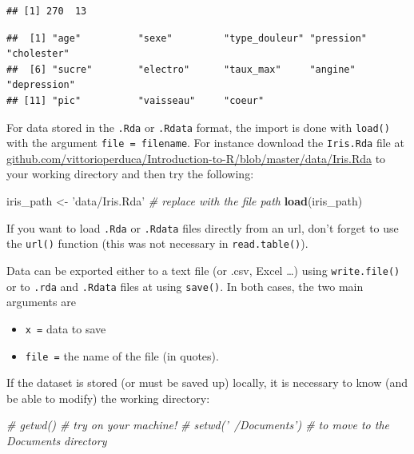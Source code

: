 \documentclass[]{book}
\newenvironment{Shaded}{\begin{snugshade}}{\end{snugshade}}
\newcommand{\CommentTok}[1]{\textcolor[rgb]{0.56,0.35,0.01}{\textit{#1}}}
\newcommand{\KeywordTok}[1]{\textcolor[rgb]{0.13,0.29,0.53}{\textbf{#1}}}
\newcommand{\NormalTok}[1]{#1}
\newcommand{\StringTok}[1]{\textcolor[rgb]{0.31,0.60,0.02}{#1}}
\providecommand{\tightlist}{%
  \setlength{\itemsep}{0pt}\setlength{\parskip}{0pt}}
\begin{document}
\begin{verbatim}
## [1] 270  13
\end{verbatim}

\begin{verbatim}
##  [1] "age"          "sexe"         "type_douleur" "pression"     "cholester"   
##  [6] "sucre"        "electro"      "taux_max"     "angine"       "depression"  
## [11] "pic"          "vaisseau"     "coeur"
\end{verbatim}

For data stored in the \texttt{.Rda} or \texttt{.Rdata} format, the import is done with \texttt{load()} with the argument \texttt{file\ =\ filename}. For instance download the \texttt{Iris.Rda} file at \href{https://github.com/vittorioperduca/Introduction-to-R/blob/master/data/Iris.Rda}{github.com/vittorioperduca/Introduction-to-R/blob/master/data/Iris.Rda} to your working directory and then try the following:

\begin{Shaded}
\begin{Highlighting}[]
\NormalTok{iris_path <-}\StringTok{ 'data/Iris.Rda'} \CommentTok{# replace with the file path}
\KeywordTok{load}\NormalTok{(iris_path)}
\end{Highlighting}
\end{Shaded}

If you want to load \texttt{.Rda} or \texttt{.Rdata} files directly from an url, don't forget to use the \texttt{url()} function (this was not necessary in \texttt{read.table()}).

Data can be exported either to a text file (or .csv, Excel \ldots{}) using \texttt{write.file()} or to \texttt{.rda} and \texttt{.Rdata} files at using \texttt{save()}. In both cases, the two main arguments are

\begin{itemize}
\tightlist
\item
  \texttt{x\ =} data to save
\item
  \texttt{file\ =} the name of the file (in quotes).
\end{itemize}

If the dataset is stored (or must be saved up) locally, it is necessary to know (and be able to modify) the working directory:

\begin{Shaded}
\begin{Highlighting}[]
\CommentTok{# getwd() # try on your machine!}
\CommentTok{# setwd('~/Documents') # to move to the Documents directory}
\end{Highlighting}
\end{Shaded}
\end{document}
